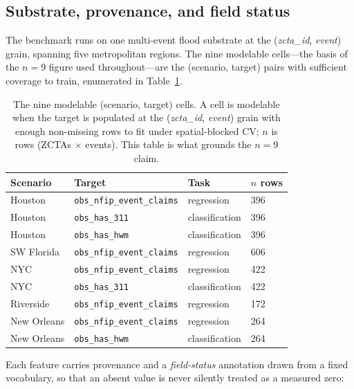 \subsection{Substrate, provenance, and field status}
\label{app:substrate}
The benchmark runs on one multi-event flood substrate at the
(\textit{zcta\_id}, \textit{event}) grain, spanning five metropolitan
regions. The nine modelable cells---the basis of the $n{=}9$ figure used
throughout---are the (scenario, target) pairs with sufficient coverage to
train, enumerated in Table~\ref{app:tab:cells}.

\begin{table}[t]
\centering
\caption{The nine modelable (scenario, target) cells. A cell is modelable
  when the target is populated at the (\textit{zcta\_id}, \textit{event})
  grain with enough non-missing rows to fit under spatial-blocked CV;
  $n$ is rows (ZCTAs $\times$ events). This table is what grounds the
  $n{=}9$ claim.}
\label{app:tab:cells}
\small
\begin{tabular}{@{}llll@{}}
\toprule
\textbf{Scenario} & \textbf{Target} & \textbf{Task} & \textbf{$n$ rows} \\
\midrule
Houston      & \texttt{obs\_nfip\_event\_claims} & regression     & 396 \\
Houston      & \texttt{obs\_has\_311}            & classification & 396 \\
Houston      & \texttt{obs\_has\_hwm}            & classification & 396 \\
SW Florida   & \texttt{obs\_nfip\_event\_claims} & regression     & 606 \\
NYC          & \texttt{obs\_nfip\_event\_claims} & regression     & 422 \\
NYC          & \texttt{obs\_has\_311}            & classification & 422 \\
Riverside    & \texttt{obs\_nfip\_event\_claims} & regression     & 172 \\
New Orleans  & \texttt{obs\_nfip\_event\_claims} & regression     & 264 \\
New Orleans  & \texttt{obs\_has\_hwm}            & classification & 264 \\
\bottomrule
\end{tabular}
\end{table}

Each feature carries provenance and a \emph{field-status}
annotation drawn from a fixed vocabulary, so that an absent value is never
silently treated as a measured zero:

